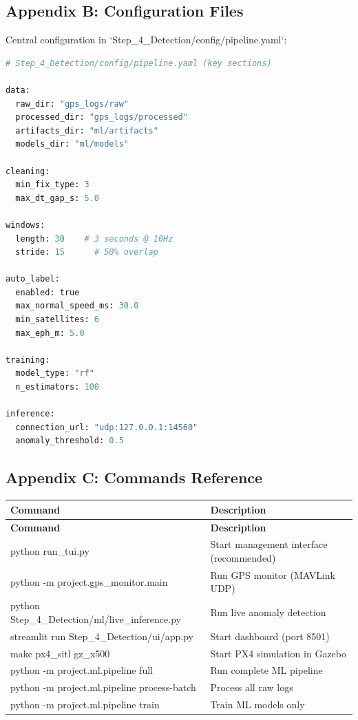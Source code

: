 \documentclass[12pt,a4paper]{article}
\begin{document}
\subsection{Appendix B: Configuration Files}

Central configuration in `Step_4_Detection/config/pipeline.yaml`:

\begin{lstlisting}[language=python, style=pythonstyle]
# Step_4_Detection/config/pipeline.yaml (key sections)

data:
  raw_dir: "gps_logs/raw"
  processed_dir: "gps_logs/processed"
  artifacts_dir: "ml/artifacts"
  models_dir: "ml/models"

cleaning:
  min_fix_type: 3
  max_dt_gap_s: 5.0

windows:
  length: 30    # 3 seconds @ 10Hz
  stride: 15      # 50% overlap

auto_label:
  enabled: true
  max_normal_speed_ms: 30.0
  min_satellites: 6
  max_eph_m: 5.0

training:
  model_type: "rf"
  n_estimators: 100

inference:
  connection_url: "udp:127.0.0.1:14560"
  anomaly_threshold: 0.5
\end{lstlisting}

\subsection{Appendix C: Commands Reference}

\begin{longtable}{|p{4cm}|p{11cm}|}
\hline
\textbf{Command} & \textbf{Description} \\
\hline
\endfirsthead
\hline
\textbf{Command} & \textbf{Description} \\
\hline
\endhead
\hline
python run\_tui.py & Start management interface (recommended) \\
\hline
python -m project.gps\_monitor.main & Run GPS monitor (MAVLink UDP) \\
\hline
python Step_4_Detection/ml/live\_inference.py & Run live anomaly detection \\
\hline
streamlit run Step_4_Detection/ui/app.py & Start dashboard (port 8501) \\
\hline
make px4\_sitl gz\_x500 & Start PX4 simulation in Gazebo \\
\hline
python -m project.ml.pipeline full & Run complete ML pipeline \\
\hline
python -m project.ml.pipeline process-batch & Process all raw logs \\
\hline
python -m project.ml.pipeline train & Train ML models only \\
\hline
\end{longtable}
\end{document}
